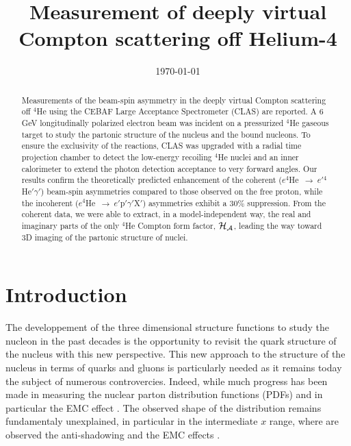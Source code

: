 \documentclass[aps,prc,preprint,superscriptaddress]{revtex4}
\begin{document}
\title{Measurement of deeply virtual Compton scattering off Helium-4}



\date{\today}

\begin{abstract}
Measurements of the beam-spin asymmetry in the deeply virtual Compton 
scattering off $^4$He using the CEBAF Large Acceptance Spectrometer (CLAS) are 
reported. A 6 GeV longitudinally polarized electron beam was incident on a 
pressurized $^4$He gaseous target to study the partonic structure of the 
nucleus and the bound nucleons. To ensure the exclusivity of the reactions, 
CLAS was upgraded with a radial time projection chamber to detect the 
low-energy recoiling $^4$He nuclei and an inner calorimeter to extend the 
photon detection acceptance to very forward angles. Our results confirm the 
theoretically predicted enhancement of the coherent 
($e^4$He~$\to~e'$$^4$He$'\gamma'$) beam-spin asymmetries compared to those 
observed on the free proton, while the incoherent 
($e^4$He~$\to~e'$p$'\gamma'$X$'$) asymmetries exhibit a 30$\%$ suppression.  
From the coherent data, we were able to extract, in a model-independent way, 
the real and imaginary parts of the only $^4$He Compton form factor, $\cal 
H_A$, leading the way toward 3D imaging of the partonic structure of nuclei.
\end{abstract}

\pacs{}

\maketitle

\section{Introduction}

The developpement of the three dimensional structure functions to study the nucleon 
in the past decades is the opportunity to revisit the quark structure of the nucleus
with this new perspective. This new approach to the structure of the nucleus in terms 
of quarks and gluons is particularly needed as it remains today the subject of numerous
controvercies. Indeed, while much progress has been made in measuring the nuclear
parton distribution functions (PDFs) and in particular the EMC effect \cite{}. The 
observed shape of the distribution remains fundamentaly unexplained, in particular
in the intermediate $x$ range, where are observed the anti-shadowing and the EMC 
effects \cite{}.  
\end{document}
